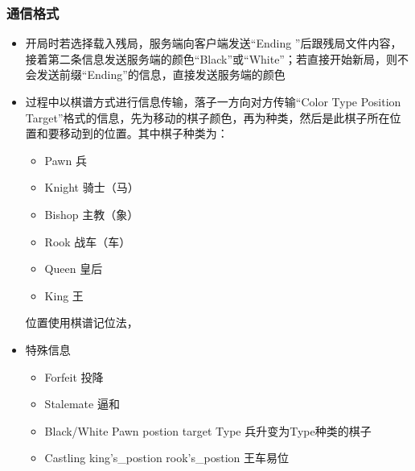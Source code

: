 \documentclass[a4paper,10pt]{article}
\begin{document}
                \subsubsection{通信格式}
                        \begin{itemize}
                         \item 开局时若选择载入残局，服务端向客户端发送“Ending ”后跟残局文件内容，接着第二条信息发送服务端的颜色“Black”或“White”；若直接开始新局，则不会发送前缀“Ending”的信息，直接发送服务端的颜色
                         \item 过程中以棋谱方式进行信息传输，落子一方向对方传输“Color Type Position Target”格式的信息，先为移动的棋子颜色，再为种类，然后是此棋子所在位置和要移动到的位置。其中棋子种类为：
                                \begin{itemize}
                                 \item Pawn 兵
                                 \item Knight 骑士（马）
                                 \item Bishop 主教（象）
                                 \item Rook 战车（车）
                                 \item Queen 皇后
                                 \item King 王
                                \end{itemize}
                        位置使用棋谱记位法，
                         \item 特殊信息
                                \begin{itemize}
                                \item Forfeit 投降
                                \item Stalemate 逼和
                                \item Black/White Pawn postion target Type 兵升变为Type种类的棋子
                                \item Castling king's\_postion rook's\_postion 王车易位
                                \end{itemize}
                        \end{itemize}
\end{document}
